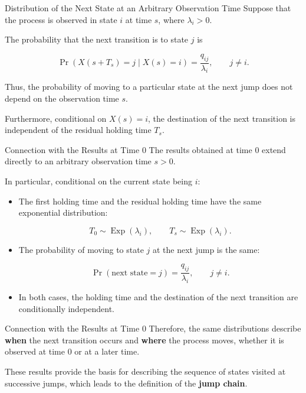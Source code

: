 \documentclass[
  ignorenonframetext,
  aspectratio=169,
]{beamer}
\begin{document}
\begin{frame}{Distribution of the Next State at an Arbitrary Observation
Time}
\protect{}\label{distribution-of-the-next-state-at-an-arbitrary-observation-time}
Suppose that the process is observed in state \(i\) at time \(s\), where
\(\lambda_i>0\).

The probability that the next transition is to state \(j\) is

\[
\boxed{
\Pr(X(s+T_s)=j\mid X(s)=i)
=\frac{q_{ij}}{\lambda_i},
\qquad j\neq i.
}
\]

Thus, the probability of moving to a particular state at the next jump
does not depend on the observation time \(s\).

Furthermore, conditional on \(X(s)=i\), the destination of the next
transition is independent of the residual holding time \(T_s\).
\end{frame}

\begin{frame}{Connection with the Results at Time 0}
\protect{}\label{connection-with-the-results-at-time-0}
The results obtained at time 0 extend directly to an arbitrary
observation time \(s>0\).

In particular, conditional on the current state being \(i\):

\begin{itemize}
\item
  The first holding time and the residual holding time have the same
  exponential distribution:

  \[
  T_0\sim\operatorname{Exp}(\lambda_i),
  \qquad
  T_s\sim\operatorname{Exp}(\lambda_i).
  \]
\item
  The probability of moving to state \(j\) at the next jump is the same:

  \[
  \Pr(\text{next state}=j)
  =\frac{q_{ij}}{\lambda_i},
  \qquad j\neq i.
  \]
\item
  In both cases, the holding time and the destination of the next
  transition are conditionally independent.
\end{itemize}
\end{frame}

\begin{frame}{Connection with the Results at Time 0}
\protect{}\label{connection-with-the-results-at-time-0-1}
Therefore, the same distributions describe \textbf{when} the next
transition occurs and \textbf{where} the process moves, whether it is
observed at time 0 or at a later time.

These results provide the basis for describing the sequence of states
visited at successive jumps, which leads to the definition of the
\textbf{jump chain}.
\end{frame}
\end{document}
